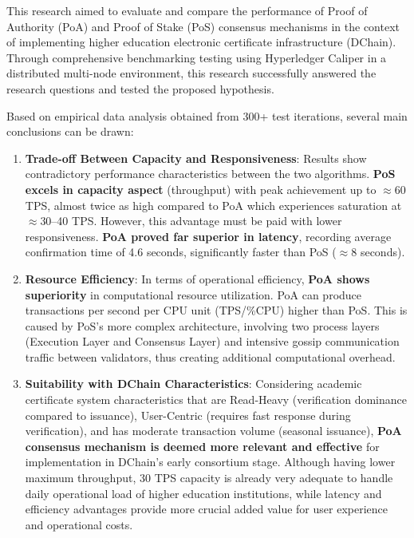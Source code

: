 \documentclass[conference]{IEEEtran}
\begin{document}
This research aimed to evaluate and compare the performance of Proof of Authority (PoA) and Proof of Stake (PoS) consensus mechanisms in the context of implementing higher education electronic certificate infrastructure (DChain). Through comprehensive benchmarking testing using Hyperledger Caliper in a distributed multi-node environment, this research successfully answered the research questions and tested the proposed hypothesis.

Based on empirical data analysis obtained from 300+ test iterations, several main conclusions can be drawn:

\begin{enumerate}
    \item \textbf{Trade-off Between Capacity and Responsiveness}: Results show contradictory performance characteristics between the two algorithms. \textbf{PoS excels in capacity aspect} (throughput) with peak achievement up to $\approx$60 TPS, almost twice as high compared to PoA which experiences saturation at $\approx$30--40 TPS. However, this advantage must be paid with lower responsiveness. \textbf{PoA proved far superior in latency}, recording average confirmation time of 4.6 seconds, significantly faster than PoS ($\approx$8 seconds).
    
    \item \textbf{Resource Efficiency}: In terms of operational efficiency, \textbf{PoA shows superiority} in computational resource utilization. PoA can produce transactions per second per CPU unit (TPS/\%CPU) higher than PoS. This is caused by PoS's more complex architecture, involving two process layers (Execution Layer and Consensus Layer) and intensive gossip communication traffic between validators, thus creating additional computational overhead.
    
    \item \textbf{Suitability with DChain Characteristics}: Considering academic certificate system characteristics that are Read-Heavy (verification dominance compared to issuance), User-Centric (requires fast response during verification), and has moderate transaction volume (seasonal issuance), \textbf{PoA consensus mechanism is deemed more relevant and effective} for implementation in DChain's early consortium stage. Although having lower maximum throughput, 30 TPS capacity is already very adequate to handle daily operational load of higher education institutions, while latency and efficiency advantages provide more crucial added value for user experience and operational costs.
\end{enumerate}
\end{document}
